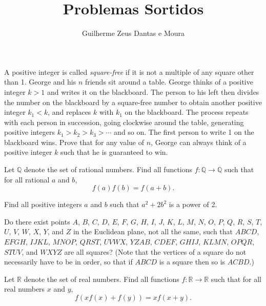 \documentclass[10pt,a4paper]{scrartcl}
\title{Problemas Sortidos}
\author{Guilherme Zeus Dantas e Moura}
\begin{document}
	
	\twocolumn[\zeustitle]

	\sloppy

	\begin{prob}%
	A positive integer is called \emph{square-free} if it is not a multiple of any square other than 1. George and his \(n\) friends sit around a table. George thinks of a positive integer \(k>1\) and writes it on the blackboard. The person to his left then divides the number on the blackboard by a square-free number to obtain another positive integer \(k_1 < k\), and replaces \(k\) with \(k_1\) on the blackboard. The process repeats with each person in succession, going clockwise around the table, generating positive integers \(k_1 > k_2 > k_3 > \cdots\) and so on. The first person to write 1 on the blackboard wins.  Prove that for any value of \(n\), George can always think of a positive integer \(k\) such that he is guaranteed to win. 
	\end{prob}

	\begin{prob}%
	Let \(\mathbb{Q}\) denote the set of rational numbers. Find all functions \(f : \mathbb{Q} \rightarrow \mathbb{Q}\) such that for all rational \(a\) and \(b\), \[f(a)f(b) = f(a+b).\]
	\end{prob}

	\begin{prob}%
	Find all positive integers \(a\) and \(b\) such that \(a^2  + 2b^2\) is a power of 2.
	\end{prob}

	\begin{prob}%
	Do there exist points \(A\), \(B\), \(C\), \(D\), \(E\), \(F\), \(G\), \(H\), \(I\), \(J\), \(K\), \(L\), \(M\), \(N\), \(O\), \(P\), \(Q\), \(R\), \(S\), \(T\), \(U\), \(V\), \(W\), \(X\), \(Y\), and \(Z\) in the Euclidean plane, not all the same, such that \(ABCD\), \(EFGH\), \(IJKL\), \(MNOP\), \(QRST\), \(UVWX\), \(YZAB\), \(CDEF\), \(GHIJ\), \(KLMN\), \(OPQR\), \(STUV\), and \(WXYZ\) are all squares?  (Note that the vertices of a square do not necessarily have to be in order, so that if \(ABCD\) is a square then so is \(ACBD\).)
	\end{prob}

	\begin{prob}%
	Let \(\mathbb{R}\) denote the set of real numbers. Find all functions \(f:\mathbb{R} \to \mathbb{R}\) such that for all real numbers \(x\) and \(y\), \[f(x f(x) + f(y)) = x f(x + y).\]
	\end{prob}
\end{document}
